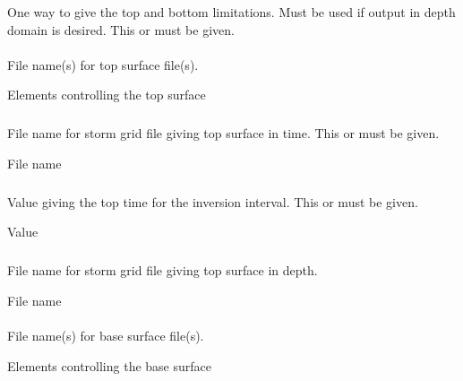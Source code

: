 \subsubsection{} 
 \slist
   \item \Description One way to give the top and bottom limitations. Must be used if output in depth domain is desired. This or  must be given.
   \item \Argument
   \item \Default
 \elist

\paragraph{\necessary} 
 \slist
   \item \Description File name(s) for top surface file(s).
   \item \Argument Elements controlling the top surface
   \item \Default
 \elist

\subparagraph{} 
 \slist
   \item \Description File name for storm grid file giving top surface in time. This or  must be given.
   \item \Argument File name
   \item \Default
 \elist

\subparagraph{} 
 \slist
   \item \Description Value giving the top time for the inversion interval. This or  must be given.
   \item \Argument Value
   \item \Default
 \elist

 \subparagraph{} 
 \slist
   \item \Description File name for storm grid file giving top surface in depth.
   \item \Argument File name
   \item \Default
 \elist

\paragraph{\necessary} 
 \slist
   \item \Description File name(s) for base surface file(s).
   \item \Argument Elements controlling the base surface
   \item \Default
 \elist

